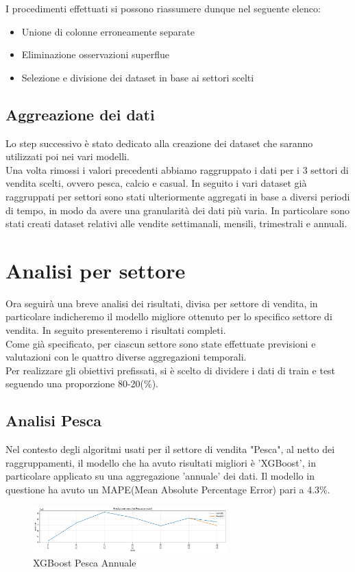 \documentclass[12pt, a4paper, twocolumn]{article} %
\begin{document}
I procedimenti effettuati si possono riassumere dunque nel seguente elenco:
\begin{itemize}
	\item Unione di colonne erroneamente separate
	\item Eliminazione osservazioni superflue
	\item Selezione e divisione dei dataset in base ai settori scelti
\end{itemize}

\subsection{Aggreazione dei dati}
Lo step successivo è stato dedicato alla creazione dei dataset che saranno utilizzati poi nei vari modelli.\\
Una volta rimossi i valori precedenti abbiamo raggruppato i dati per i 3 settori di vendita scelti, ovvero pesca, calcio e casual. In seguito i vari dataset già raggruppati per settori sono stati ulteriormente aggregati in base a diversi periodi di tempo, in modo da avere una granularità dei dati più varia. In particolare sono stati creati dataset relativi alle vendite settimanali, mensili, trimestrali e annuali.

\section{Analisi per settore}
Ora seguirà una breve analisi dei risultati, divisa per settore di vendita, in particolare indicheremo il modello migliore ottenuto per lo specifico settore di vendita. In seguito presenteremo i risultati completi.\\
Come già specificato, per ciascun settore sono state effettuate previsioni e valutazioni con le quattro diverse aggregazioni temporali.\\
Per realizzare gli obiettivi prefissati, si è scelto di dividere i dati di train e test seguendo una proporzione 80-20(\%).

\subsection{Analisi Pesca}
Nel contesto degli algoritmi usati per il settore di vendita "Pesca", al netto dei raggruppamenti, il modello che ha avuto risultati migliori è 'XGBoost', in particolare applicato su una aggregazione 'annuale' dei dati. Il modello in questione ha avuto un MAPE(Mean Absolute Percentage Error) pari a 4.3\%.
\begin{figure}[H]
  \caption{XGBoost Pesca Annuale}
  \begin{center}
    \includegraphics[width=75mm,scale=0.5]{pesca_annuale_4.31_xgbost_noValori}
  \end{center}
\end{figure}
\end{document}
